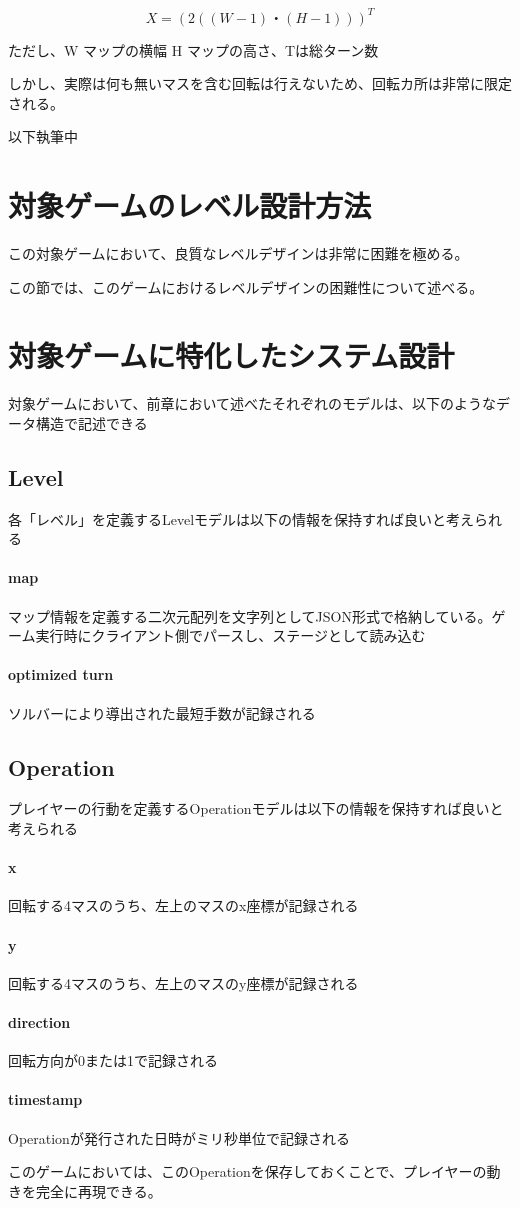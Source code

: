 \[ X = (2((W-1)・(H-1)))^T \]

ただし、W マップの横幅 H マップの高さ、Tは総ターン数

しかし、実際は何も無いマスを含む回転は行えないため、回転カ所は非常に限定される。

以下執筆中


\section{対象ゲームのレベル設計方法}
この対象ゲームにおいて、良質なレベルデザインは非常に困難を極める。

この節では、このゲームにおけるレベルデザインの困難性について述べる。


\section{対象ゲームに特化したシステム設計}
対象ゲームにおいて、前章において述べたそれぞれのモデルは、以下のようなデータ構造で記述できる

\subsection{Level}
各「レベル」を定義するLevelモデルは以下の情報を保持すれば良いと考えられる

\paragraph{map}
マップ情報を定義する二次元配列を文字列としてJSON形式で格納している。ゲーム実行時にクライアント側でパースし、ステージとして読み込む

\paragraph{optimized turn}
ソルバーにより導出された最短手数が記録される

\subsection{Operation}
プレイヤーの行動を定義するOperationモデルは以下の情報を保持すれば良いと考えられる

\paragraph{x}
回転する4マスのうち、左上のマスのx座標が記録される
\paragraph{y}
回転する4マスのうち、左上のマスのy座標が記録される
\paragraph{direction}
回転方向が0または1で記録される
\paragraph{timestamp}
Operationが発行された日時がミリ秒単位で記録される

このゲームにおいては、このOperationを保存しておくことで、プレイヤーの動きを完全に再現できる。
